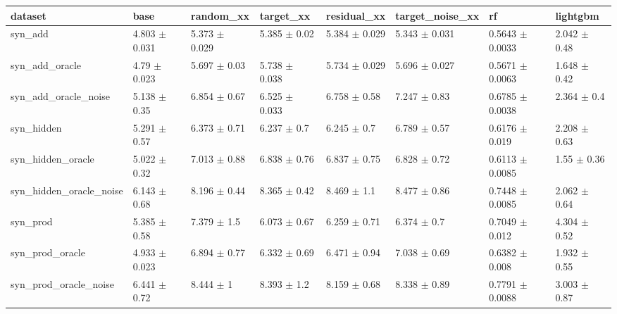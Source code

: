 \begin{tabular}{llllllll}
\toprule
dataset & base & random\_xx & target\_xx & residual\_xx & target\_noise\_xx & rf & lightgbm \\
\midrule
syn\_add & 4.803 $\pm$ 0.031 & 5.373 $\pm$ 0.029 & 5.385 $\pm$ 0.02 & 5.384 $\pm$ 0.029 & 5.343 $\pm$ 0.031 & 0.5643 $\pm$ 0.0033 & 2.042 $\pm$ 0.48 \\
syn\_add\_oracle & 4.79 $\pm$ 0.023 & 5.697 $\pm$ 0.03 & 5.738 $\pm$ 0.038 & 5.734 $\pm$ 0.029 & 5.696 $\pm$ 0.027 & 0.5671 $\pm$ 0.0063 & 1.648 $\pm$ 0.42 \\
syn\_add\_oracle\_noise & 5.138 $\pm$ 0.35 & 6.854 $\pm$ 0.67 & 6.525 $\pm$ 0.033 & 6.758 $\pm$ 0.58 & 7.247 $\pm$ 0.83 & 0.6785 $\pm$ 0.0038 & 2.364 $\pm$ 0.4 \\
syn\_hidden & 5.291 $\pm$ 0.57 & 6.373 $\pm$ 0.71 & 6.237 $\pm$ 0.7 & 6.245 $\pm$ 0.7 & 6.789 $\pm$ 0.57 & 0.6176 $\pm$ 0.019 & 2.208 $\pm$ 0.63 \\
syn\_hidden\_oracle & 5.022 $\pm$ 0.32 & 7.013 $\pm$ 0.88 & 6.838 $\pm$ 0.76 & 6.837 $\pm$ 0.75 & 6.828 $\pm$ 0.72 & 0.6113 $\pm$ 0.0085 & 1.55 $\pm$ 0.36 \\
syn\_hidden\_oracle\_noise & 6.143 $\pm$ 0.68 & 8.196 $\pm$ 0.44 & 8.365 $\pm$ 0.42 & 8.469 $\pm$ 1.1 & 8.477 $\pm$ 0.86 & 0.7448 $\pm$ 0.0085 & 2.062 $\pm$ 0.64 \\
syn\_prod & 5.385 $\pm$ 0.58 & 7.379 $\pm$ 1.5 & 6.073 $\pm$ 0.67 & 6.259 $\pm$ 0.71 & 6.374 $\pm$ 0.7 & 0.7049 $\pm$ 0.012 & 4.304 $\pm$ 0.52 \\
syn\_prod\_oracle & 4.933 $\pm$ 0.023 & 6.894 $\pm$ 0.77 & 6.332 $\pm$ 0.69 & 6.471 $\pm$ 0.94 & 7.038 $\pm$ 0.69 & 0.6382 $\pm$ 0.008 & 1.932 $\pm$ 0.55 \\
syn\_prod\_oracle\_noise & 6.441 $\pm$ 0.72 & 8.444 $\pm$ 1 & 8.393 $\pm$ 1.2 & 8.159 $\pm$ 0.68 & 8.338 $\pm$ 0.89 & 0.7791 $\pm$ 0.0088 & 3.003 $\pm$ 0.87 \\
\bottomrule
\end{tabular}
